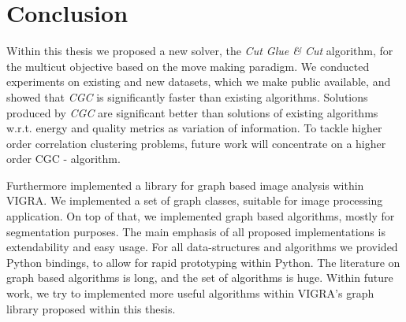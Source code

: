 \chapter{Conclusion}\label{ch:conclusion}

Within this thesis we proposed
a new solver, the \emph{Cut Glue \& Cut} algorithm, for the multicut objective
based on the move making paradigm.
We conducted experiments on existing 
and new datasets, which we make public available,
and showed that \emph{CGC}
is significantly faster than existing 
algorithms.
Solutions produced by \emph{CGC} are significant
better than solutions of existing  algorithms w.r.t. energy
and quality metrics as variation of information.
To tackle higher order correlation clustering problems,
future work will concentrate on a higher order CGC - algorithm.


Furthermore implemented a library
for graph based image analysis within VIGRA.
We implemented a set of graph classes, 
suitable for image processing application.
On top of that, we implemented 
graph based algorithms, mostly for
segmentation purposes.
The main emphasis of all proposed
implementations is extendability and easy usage.
For all data-structures and
algorithms we provided Python bindings,
to allow for rapid prototyping 
within Python.
The literature on graph based
algorithms is long, and the set of
algorithms is huge.
Within future work, we try to implemented
more useful algorithms within
VIGRA's graph library proposed within this thesis. 

